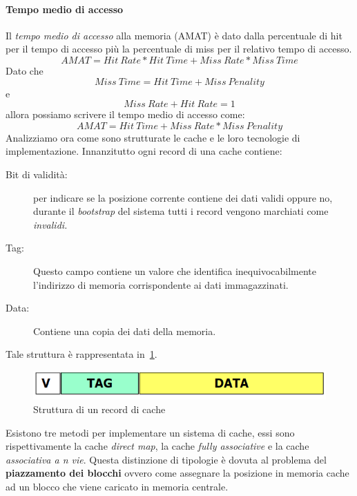 \paragraph{Tempo medio di accesso}
Il \emph{tempo medio di accesso} alla memoria (AMAT) è dato dalla percentuale di hit per il tempo di accesso più la percentuale di miss per il relativo tempo di accesso. 
$$AMAT = Hit \ Rate * Hit \ Time + Miss \ Rate * Miss \ Time$$
Dato che
$$Miss \ Time = Hit \ Time + Miss \ Penality$$
e
$$Miss \ Rate + Hit \ Rate = 1$$
allora possiamo scrivere il tempo medio di accesso come:
$$AMAT = Hit \ Time + Miss \ Rate * Miss \ Penality$$
Analizziamo ora come sono strutturate le cache e le loro tecnologie di implementazione.
Innanzitutto ogni record di una cache contiene:
\begin{description}
\item[Bit di validità:] per indicare se la posizione corrente contiene dei dati validi oppure no, durante il \emph{bootstrap} del sistema tutti i record vengono marchiati come \emph{invalidi.}
\item[Tag:] Questo campo contiene un valore che identifica inequivocabilmente l'indirizzo di memoria corrispondente ai dati immagazzinati.
\item[Data:] Contiene una copia dei dati della memoria.
\end{description}
Tale struttura è rappresentata in \figurename\,\ref{fig:cachestruct}.
\begin{figure}
\centering
\includegraphics[scale=0.4]{img/cachestruct.png}
\caption{Struttura di un record di cache}\label{fig:cachestruct}
\end{figure}
Esistono tre metodi per implementare un sistema di cache, essi sono rispettivamente la cache \emph{direct map}, la cache \emph{fully associative} e la cache \emph{associativa a n vie}. Questa distinzione di tipologie è dovuta al problema del \textbf{piazzamento dei blocchi} ovvero come assegnare la posizione in memoria cache ad un blocco che viene caricato in memoria centrale.
